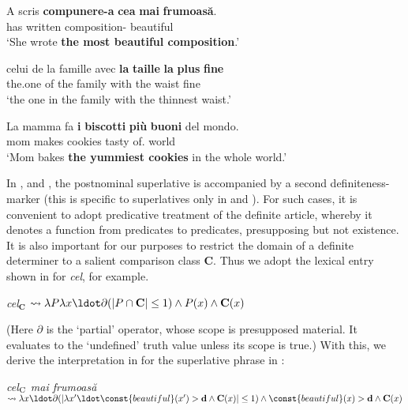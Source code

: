 \documentclass[output=paper
,modfonts
,nonflat]{langsci/langscibook}
\begin{document}
\ea \label{ex:coppockstrand:90}
\gll A scris \textbf{compunere-a} \textbf{cea} \textbf{mai} \textbf{frumoasă}.\\
has written composition-  \cmpr{} beautiful\\ 
\glt `She wrote \textbf{the most beautiful composition}.'
\z

\ea \label{ex:coppockstrand:91}
\gll celui de la famille avec \textbf{la} \textbf{taille} \textbf{la} \textbf{plus} \textbf{fine} \\ 
the.one of the family with the waist  \cmpr{} {fine}\\ 
\glt `the one in the family with the thinnest waist.'
\z

\ea \label{ex:coppockstrand:92}
\gll La mamma fa \textbf{i} \textbf{biscotti} \textbf{più} \textbf{buoni} del mondo.\\
 mom makes  cookies \cmpr{} tasty of. world\\ 
\glt `Mom bakes \textbf{the yummiest cookies} in the whole world.' 
\z

In ,  and , the postnominal superlative is accompanied by a second definiteness-marker (this is specific to superlatives only in  and ). For such cases, it is convenient to adopt  predicative treatment of the definite article, whereby it denotes a function from predicates to predicates, presupposing  but not existence. It is also important for our purposes to restrict the domain of a definite determiner to a salient comparison class $\textbf{C}$. Thus we adopt the lexical entry shown in  for  \textit{cel}, for example.

\ea \label{ex:coppockstrand:93}
\textit{cel}$_{\textbf{C}}$ $\leadsto \lambda P \lambda x \ldot \partial(|P\cap \textbf{C}|\leq 1) \land P(x) \land \textbf{C}(x)$
\z 

(Here $\partial$ is the `partial' operator, whose scope is presupposed material. It evaluates to the `undefined' truth value unless its scope is true.) With this, we derive the interpretation in  for the superlative phrase in :

\ea \label{ex:coppockstrand:94}
{\em cel$_{\textbf{\textnormal{C}}}$ mai frumoasă} $\leadsto \lambda x \ldot \partial(|\lambda x'\ldot \const{beautiful}(x') > \textbf{d} \land \textbf{C}(x)|\leq 1) \land \const{beautiful}(x) > \textbf{d} \land \textbf{C}(x)$ 
\z 
\end{document}
